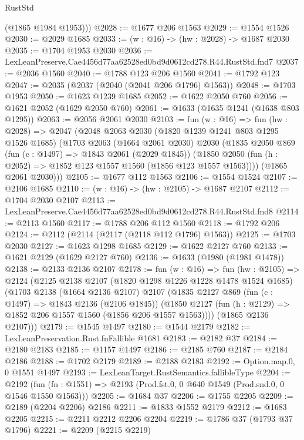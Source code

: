 \begin{lexlean}{RustStd}
\begin{coremodule}
        (@1865 @1984 @1953)))
@2028 := @1677 @206 @1563
@2029 := @1554 @1526
@2030 := @2029 @1685
@2033 := (w : @16) -> (hw : @2028) -> @1687 @2030
@2035 := @1704 @1953 @2030
@2036 := LexLeanPreserve.Cae4456d77aa62528ed0bd9d0612cd278.R44.RustStd.fnd7
@2037 := @2036 @1560
@2040 := @1788 @123 @206 @1560
@2041 := @1792 @123
@2047 := @2035 (@2037 (@2040 (@2041 @206 @1796) @1563))
@2048 := @1703 @1953
@2050 := @1623 @1239 @1685
@2052 := @1622 @2050 @760
@2056 := @1621 @2052 (@1629 @2050 @760)
@2061 := @1633 (@1635 @1241 (@1638 @803 @1295))
@2063 := @2056 @2061 @2030
@2103 := fun (w : @16) =>
  fun (hw : @2028) =>
  @2047
    (@2048
      @2063
      @2030
      (@1820 @1239 @1241 @803 @1295 @1526 @1685)
      (@1703
        @2063
        (@1664 @2061 @2030)
        @2030
        (@1835
          @2050
          @869
          (fun (c : @1497) => @1843 @2061 (@2029 @1845))
          (@1850 @2050 (fun (h : @2052) => @1852 @123 @1557 @1560 (@1856 @123 @1557 @1563))))
        (@1865 @2061 @2030)))
@2105 := @1677 @112 @1563
@2106 := @1554 @1524
@2107 := @2106 @1685
@2110 := (w : @16) -> (hw : @2105) -> @1687 @2107
@2112 := @1704 @2030 @2107
@2113 := LexLeanPreserve.Cae4456d77aa62528ed0bd9d0612cd278.R44.RustStd.fnd8
@2114 := @2113 @1560
@2117 := @1788 @206 @112 @1560
@2118 := @1792 @206
@2124 := @2112 (@2114 (@2117 (@2118 @112 @1796) @1563))
@2125 := @1703 @2030
@2127 := @1623 @1298 @1685
@2129 := @1622 @2127 @760
@2133 := @1621 @2129 (@1629 @2127 @760)
@2136 := @1633 (@1980 (@1981 @1478))
@2138 := @2133 @2136 @2107
@2178 := fun (w : @16) =>
  fun (hw : @2105) =>
  @2124
    (@2125
      @2138
      @2107
      (@1820 @1298 @1226 @1228 @1478 @1524 @1685)
      (@1703
        @2138
        (@1664 @2136 @2107)
        @2107
        (@1835
          @2127
          @869
          (fun (c : @1497) => @1843 @2136 (@2106 @1845))
          (@1850 @2127 (fun (h : @2129) => @1852 @206 @1557 @1560 (@1856 @206 @1557 @1563))))
        (@1865 @2136 @2107)))
@2179 := @1545 @1497
@2180 := @1544 @2179
@2182 := LexLeanPreservation.Rust.fnFallible @1681
@2183 := @2182 @37
@2184 := @2180 @2183
@2185 := @1157 @1497
@2186 := @2185 @760
@2187 := @2184 @2186
@2188 := @1702 @2179
@2189 := @2188 @2183
@2192 := Option.map.{0, 0} @1551 @1497
@2193 := LexLeanTarget.RustSemantics.fallibleType
@2204 := @2192
    (fun (fn : @1551) => @2193 (Prod.fst.{0, 0} @640 @1549 (Prod.snd.{0, 0} @1546 @1550 @1563)))
@2205 := @1684 @37
@2206 := @1755 @2205
@2209 := @2189 (@2204 @2206) @2186
@2211 := @1833 @1552 @2179
@2212 := @1683 @2205
@2215 := @2211 @2212 @2206 @2204
@2219 := @1786 @37 (@1793 @37 @1796)
@2221 := @2209 (@2215 @2219)

\end{coremodule}
\end{lexlean}
